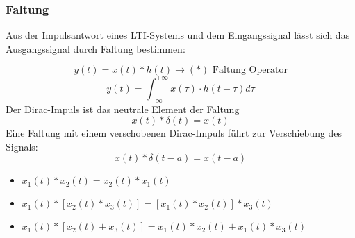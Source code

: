 \subsubsection{Faltung}
Aus der Impulsantwort eines LTI-Systems und dem Eingangssignal lässt sich das
Ausgangssignal durch Faltung bestimmen:
\begin{mdframed}[style=exercise]
  \[
      y(t)=x(t)*h(t) \rightarrow (*)\text{ Faltung Operator}
  \]
  \[
      \boxed{y(t) = \int_{-\infty}^{+\infty} x(\tau)\cdot h(t-\tau)d\tau}
  \]
  \bulletpt Der Dirac-Impuls ist das neutrale Element der Faltung
  \[
      x(t)*\delta(t)=x(t)
  \]
  \bulletpt Eine Faltung mit einem verschobenen Dirac-Impuls führt zur Verschiebung
  des Signals:
  \[
      x(t)* \delta(t - a) = x(t - a)
  \]
\end{mdframed}
\begin{mdframed}[style=exercise,frametitle=Rechenregeln]
  \begin{itemize}
      \item{$x_1(t)*x_2(t)=x_2(t)*x_1(t)$}
      \item{$x_1(t)*[x_2(t)*x_3(t)]=[x_1(t)*x_2(t)]*x_3(t)$}
      \item{$x_1(t)*[x_2(t)+x_3(t)]=x_1(t)*x_2(t)+x_1(t)*x_3(t)$}
  \end{itemize}
\end{mdframed}
